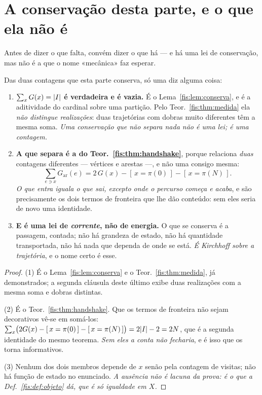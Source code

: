 \documentclass[livro.tex]{subfiles}
\begin{document}
\section{A conservação desta parte, e o que ela não é}\label{fis:mec-conserva}

\noindent Antes de dizer o que falta, convém dizer o que há --- e há uma lei de
conservação, mas não é a que o nome «mecânica» faz esperar.

\begin{teorema}\label{fis:thm:kirchhoff}
Das duas contagens que esta parte conserva, só uma diz alguma coisa:
\begin{enumerate}\itemsep3pt
\item[(1)] \textbf{$\sum_x G(x)=\lvert I\rvert$ é verdadeira e é vazia.} É o
Lema~\ref{fis:lem:conserva}, e é a aditividade do cardinal sobre uma partição.
Pelo Teor.~\ref{fis:thm:medida} ela \emph{não distingue realizações}: duas
trajetórias com dobras muito diferentes têm a mesma soma. \emph{Uma conservação
que não separa nada não é uma lei; é uma contagem.}
\item[(2)] \textbf{A que separa é a do Teor.~\ref{fis:thm:handshake}}, porque
relaciona \emph{duas} contagens diferentes --- vértices e arestas ---, e não uma
consigo mesma:
\[
\sum_{e\ni x}G_{\mathrm{ar}}(e)=2\,G(x)-[\,x=\pi(0)\,]-[\,x=\pi(N)\,] .
\]
\emph{O que entra iguala o que sai, excepto onde o percurso começa e acaba}, e
são precisamente os dois termos de fronteira que lhe dão conteúdo: sem eles
seria de novo uma identidade.
\item[(3)] \textbf{E é uma lei de \emph{corrente}, não de energia.} O que se
conserva é a passagem, contada; não há grandeza de estado, não há quantidade
transportada, não há nada que dependa de onde se está. \emph{É Kirchhoff sobre a
trajetória}, e o nome certo é esse.
\end{enumerate}
\end{teorema}

\begin{proof}
(1) É o Lema~\ref{fis:lem:conserva} e o Teor.~\ref{fis:thm:medida}, já
demonstrados; a segunda cláusula deste último exibe duas realizações com a mesma
soma e dobras distintas.

(2) É o Teor.~\ref{fis:thm:handshake}. Que os termos de fronteira não sejam
decorativos vê-se em somá-los: $\sum_x\bigl(2G(x)-[\,x=\pi(0)\,]-[\,x=\pi(N)\,]\bigr)
=2\lvert I\rvert-2=2N$, que é a segunda identidade do mesmo teorema. \emph{Sem eles a
conta não fecharia}, e é isso que os torna informativos.

(3) Nenhum dos dois membros depende de $x$ senão pela contagem de visitas; não há
função de estado no enunciado. \emph{A ausência não é lacuna da prova: é o que a
Def.~\ref{fis:def:objeto} dá, que é só igualdade em $X$.}
\end{proof}
\end{document}
